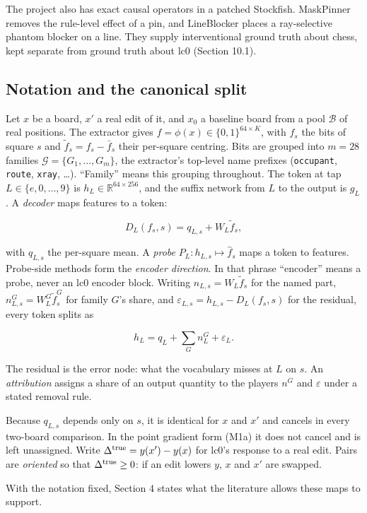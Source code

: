 \documentclass[conference]{IEEEtran}
\begin{document}
The project also has exact causal operators in a patched Stockfish. MaskPinner removes the rule-level effect of a pin, and LineBlocker places a ray-selective phantom blocker on a line. They supply interventional ground truth about chess, kept separate from ground truth about lc0 (Section 10.1).

\subsection{Notation and the canonical split}\label{sec:3.2}
Let $x$ be a board, $x'$ a real edit of it, and $x_0$ a baseline board from a pool $\mathcal B$ of real positions. The extractor gives $f=\phi(x)\in\{0,1\}^{64\times K}$, with $f_s$ the bits of square $s$ and $\tilde f_s=f_s-\bar f_s$ their per-square centring. Bits are grouped into $m=28$ families $\mathcal G=\{G_1,\dots,G_m\}$, the extractor's top-level name prefixes (\texttt{occupant}, \texttt{route}, \texttt{xray}, \ldots{}). ``Family'' means this grouping throughout. The token at tap $L\in\{e,0,\dots,9\}$ is $h_L\in\mathbb R^{64\times256}$, and the suffix network from $L$ to the output is $g_L$. A \emph{decoder} maps features to a token:

\[
D_L(f_s,s)=q_{L,s}+W_L\tilde f_s,
\]

with $q_{L,s}$ the per-square mean. A \emph{probe} $P_L:h_{L,s}\mapsto\hat f_s$ maps a token to features. Probe-side methods form the \emph{encoder direction}. In that phrase ``encoder'' means a probe, never an lc0 encoder block. Writing $n_{L,s}=W_L\tilde f_s$ for the named part, $n^G_{L,s}=W^G_L\tilde f^G_s$ for family $G$'s share, and $\varepsilon_{L,s}=h_{L,s}-D_L(f_s,s)$ for the residual, every token splits as

\[
h_L=q_L+\sum_G n^G_L+\varepsilon_L.
\]

The residual is the error node: what the vocabulary misses at $L$ on $s$. An \emph{attribution} assigns a share of an output quantity to the players $n^G$ and $\varepsilon$ under a stated removal rule.

Because $q_{L,s}$ depends only on $s$, it is identical for $x$ and $x'$ and cancels in every two-board comparison. In the point gradient form (M1a) it does not cancel and is left unassigned. Write $\Delta^{\rm true}=y(x')-y(x)$ for lc0's response to a real edit. Pairs are \emph{oriented} so that $\Delta^{\rm true}\ge0$: if an edit lowers $y$, $x$ and $x'$ are swapped.

With the notation fixed, Section 4 states what the literature allows these maps to support.
\end{document}
